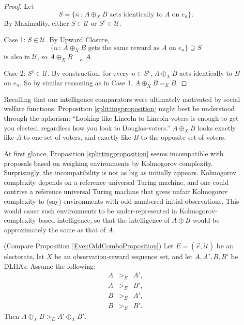 \documentclass[twoside,11pt]{article}
\begin{document}
\begin{proof}
    Let
    \[
        S = \{n\,:\,\mbox{$A\oplus_X B$ acts identically to $A$ on $e_n$}\}.
    \]
    By Maximality, either $S\in\mathscr U$ or $S^c\in\mathscr U$.

    Case 1: $S\in\mathscr U$.
    By Upward Closure,
    \[
        \{n\,:\,\mbox{$A\oplus_X B$ gets the same reward as $A$ on $e_n$}\}
        \supseteq
        S
    \]
    is also in $\mathscr U$, so $A\oplus_X B =_{E} A$.

    Case 2: $S^c\in\mathscr U$.
    By construction, for every $n\in S^c$, $A\oplus_X B$ acts identically to $B$ on $e_n$.
    So by similar reasoning as in Case 1, $A\oplus_X B =_{E} B$.
\end{proof}

Recalling that our intelligence comparators were ultimately motivated by
social welfare functions,
Proposition \ref{splittingproposition} might best be understood through
the aphorism: ``Looking like Lincoln to Lincoln-voters is
enough to get you elected, regardless how you look to Douglas-voters.''
$A\oplus_X B$ looks exactly like $A$ to one set of voters, and exactly like
$B$ to the opposite set of voters.

At first glance, Proposition \ref{splittingproposition} seems incompatible with
proposals based on weighing environments by Kolmogorov complexity. Surprisingly,
the incompatibility is not as big as initially appears.
Kolmogorov complexity depends on a reference universal Turing machine, and one could
contrive a reference universal Turing machine that gives unfair Kolmogorov complexity
to (say) environments with odd-numbered initial observations. This would cause
such environments to be under-represented in Kolmogorov-complexity-based intelligence,
so that the intelligence of $A\oplus B$ would be approximately the same as that of
$A$.


\begin{proposition}
\label{GeneralizedComboProposition}
    (Compare Proposition \ref{EvenOddComboProposition})
    Let $E=(\vec{e},\mathscr U)$ be an electorate,
    let $X$ be an observation-reward sequence set,
    and let $A,A',B,B'$ be DLHAs.
    Assume the following:
    \begin{eqnarray*}
        A &{>_{E}}& A',\\
        A &{>_{E}}& B',\\
        B &{>_{E}}& A',\\
        B &{>_{E}}& B'.
    \end{eqnarray*}
    Then $A\oplus_X B>_{E} A'\oplus_X B'$.
\end{proposition}
\end{document}
